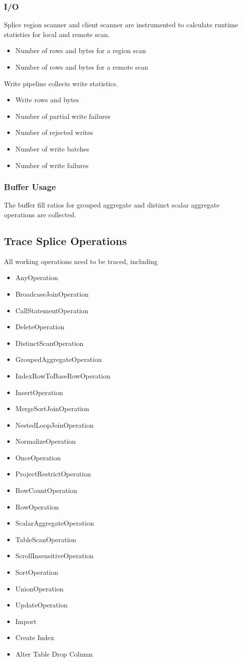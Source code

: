 \documentclass{article}
\begin{document}
\subsubsection{I/O}
Splice region scanner and client scanner are instrumented to calculate runtime statistics for local and remote scan.
\begin{itemize}
  \item Number of rows and bytes for a region scan
  \item Number of rows and bytes for a remote scan
\end{itemize}
Write pipeline collects write statistics.
\begin{itemize}
  \item Write rows and bytes
  \item Number of partial write failures
  \item Number of rejected writes
  \item Number of write batches
  \item Number of write failures
\end{itemize}
\subsubsection{Buffer Usage}
The buffer fill ratios for grouped aggregate and distinct scalar aggregate operations are collected.
\subsection{Trace Splice Operations}
All working operations need to be traced, including
\begin{itemize}
  \item AnyOperation
  \item BroadcaseJoinOperation
  \item CallStatementOperation
  \item DeleteOperation
  \item DistinctScanOperation
  \item GroupedAggregateOperation
  \item IndexRowToBaseRowOperation
  \item InsertOperation
  \item MergeSortJoinOperation
  \item NestedLoopJoinOperation
  \item NormalizeOperation
  \item OnceOperation
  \item ProjectRestrictOperation
  \item RowCountOperation
  \item RowOperation
  \item ScalarAggregateOperation
  \item TableScanOperation
  \item ScrollInsensitiveOperation
  \item SortOperation
  \item UnionOperation
  \item UpdateOperation
  \item Import
  \item Create Index
  \item Alter Table Drop Column
\end{itemize}
\end{document}
